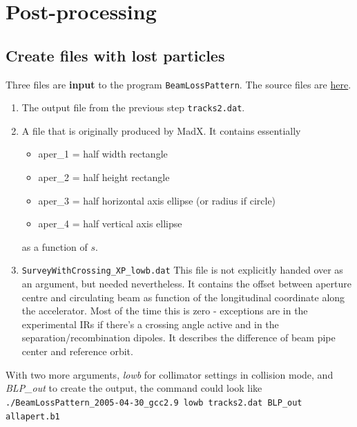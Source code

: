 \documentclass[a4paper, oneside, final]{scrartcl}
\begin{document}
{{{\section{Post-processing}

\subsection{Create files with lost particles}

Three files are \textbf{input} to the program \texttt{BeamLossPattern}. The source files are {\href{http://lhc-collimation-project.web.cern.ch/lhc-collimation-project/BeamLossPattern.htm}{here}}.

\begin{enumerate}
\item The output file from the previous step \texttt{tracks2.dat}. 
\item A file that is originally produced by MadX. It contains essentially 

\begin{itemize}
\item aper\_1 = half width rectangle
\item aper\_2 = half height rectangle
\item aper\_3 = half horizontal axis ellipse (or radius if circle)
\item aper\_4 = half vertical axis ellipse
\end{itemize}

as a function of $s$. 

\item \texttt{SurveyWithCrossing\_XP\_lowb.dat} This file is not explicitly handed over as an argument, but needed nevertheless. It contains the offset between aperture centre and circulating beam as function of the longitudinal coordinate along the accelerator. Most of the time this is zero - exceptions are in the experimental IRs if there's a crossing angle active and in the separation/recombination dipoles. It describes the difference of beam pipe center and reference orbit.
\end{enumerate}

With two more arguments, \textit{lowb} for collimator settings in collision mode, and \textit{BLP\_out} to create the output, the command could look like \\

\texttt{./BeamLossPattern\_2005-04-30\_gcc2.9 lowb tracks2.dat BLP\_out allapert.b1}\newline

}}}
\end{document}
